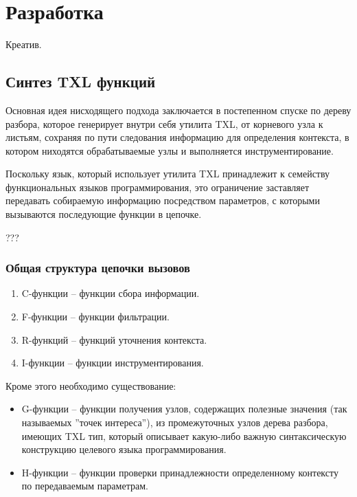 \chapter{Разработка}

Креатив.

\section{Синтез TXL функций}

Основная идея нисходящего подхода заключается в постепенном спуске по дереву разбора, которое генерирует внутри себя утилита TXL, от корневого узла к листьям, сохраняя по пути следования информацию для определения контекста, в котором ниходятся обрабатываемые узлы и выполняется инструментирование.

Поскольку язык, который использует утилита TXL принадлежит к семейству функциональных языков программирования, это ограничение заставляет передавать собираемую информацию посредством параметров, с которыми вызываются последующие функции в цепочке.

???

\subsection{Общая структура цепочки вызовов}

\begin{enumerate}
  \item C-функции -- функции сбора информации.
  \item F-функции -- функции фильтрации.
  \item R-функций -- функций уточнения контекста.
  \item I-функции -- функции инструментирования.
\end{enumerate}

Кроме этого необходимо существование:
\begin{itemize}
  \item G-функции -- функции получения узлов, содержащих полезные значения (так называемых ''точек интереса''), из промежуточных узлов дерева разбора, имеющих TXL тип, который описывает какую-либо важную синтаксическую конструкцию целевого языка программирования.
  \item H-функции -- функции проверки принадлежности определенному контексту по передаваемым параметрам.
\end{itemize}

